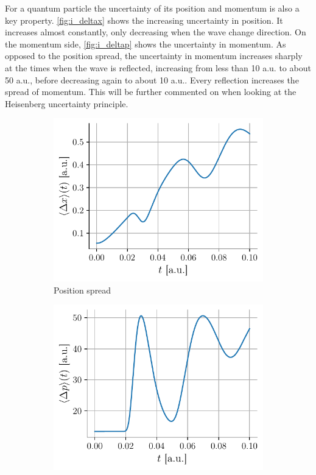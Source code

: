 For a quantum particle the uncertainty of its position and momentum is also a key property. \autoref{fig:i_deltax} shows the increasing uncertainty in position. It increases almost constantly, only decreasing when the wave change direction. On the momentum side, \autoref{fig:i_deltap} shows the uncertainty in momentum. As opposed to the position spread, the uncertainty in momentum increases sharply at the times when the wave is reflected, increasing from less than 10 a.u. to about 50 a.u., before decreasing again to about 10 a.u.. Every reflection increases the spread of momentum. This will be further commented on when looking at the Heisenberg uncertainty principle.

\begin{figure}[h]
    \centering
    \begin{subfigure}{0.48\linewidth}
        \centering
        \includegraphics[width=\linewidth]{figures/i_deltax.pdf}
        \caption{Position spread}
        \label{fig:i_deltax}
    \end{subfigure}
    \begin{subfigure}{0.48\linewidth}
        \centering
        \includegraphics[width=\linewidth]{figures/i_deltap.pdf}

\end{subfigure}
\end{figure}
